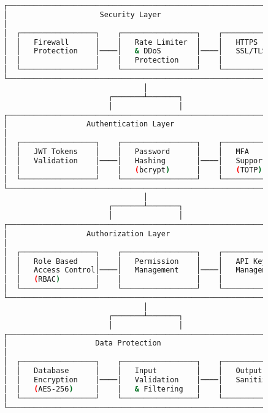 \documentclass[main.tex]{subfiles}
\begin{document}
\begin{figure}[h]
\centering
\begin{lstlisting}[language=bash, caption=Системийн аюулгүй байдлын архитектур]
┌─────────────────────────────────────────────────────────────────┐
│                     Security Layer                              │
│                                                                 │
│  ┌─────────────────┐    ┌─────────────────┐    ┌─────────────┐  │
│  │   Firewall      │    │   Rate Limiter  │    │   HTTPS     │  │
│  │   Protection    │────│   & DDoS        │────│   SSL/TLS   │  │
│  │                 │    │   Protection    │    │             │  │
│  └─────────────────┘    └─────────────────┘    └─────────────┘  │
└─────────────────────────────────────────────────────────────────┘
                                │
                        ┌───────┴───────┐
                        │               │
┌─────────────────────────────────────────────────────────────────┐
│                  Authentication Layer                           │
│                                                                 │
│  ┌─────────────────┐    ┌─────────────────┐    ┌─────────────┐  │
│  │   JWT Tokens    │    │   Password      │    │   MFA       │  │
│  │   Validation    │────│   Hashing       │────│   Support   │  │
│  │                 │    │   (bcrypt)      │    │   (TOTP)    │  │
│  └─────────────────┘    └─────────────────┘    └─────────────┘  │
└─────────────────────────────────────────────────────────────────┘
                                │
                        ┌───────┴───────┐
                        │               │
┌─────────────────────────────────────────────────────────────────┐
│                  Authorization Layer                            │
│                                                                 │
│  ┌─────────────────┐    ┌─────────────────┐    ┌─────────────┐  │
│  │   Role Based    │    │   Permission    │    │   API Key   │  │
│  │   Access Control│────│   Management    │────│   Management│  │
│  │   (RBAC)        │    │                 │    │             │  │
│  └─────────────────┘    └─────────────────┘    └─────────────┘  │
└─────────────────────────────────────────────────────────────────┘
                                │
                        ┌───────┴───────┐
                        │               │
┌─────────────────────────────────────────────────────────────────┐
│                    Data Protection                              │
│                                                                 │
│  ┌─────────────────┐    ┌─────────────────┐    ┌─────────────┐  │
│  │   Database      │    │   Input         │    │   Output    │  │
│  │   Encryption    │────│   Validation    │────│   Sanitization│ │
│  │   (AES-256)     │    │   & Filtering   │    │             │  │
│  └─────────────────┘    └─────────────────┘    └─────────────┘  │
└─────────────────────────────────────────────────────────────────┘
\end{lstlisting}
\end{figure}
\end{document}
